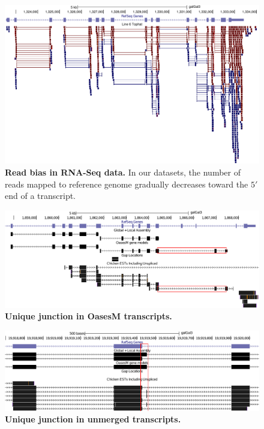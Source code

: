 \documentclass[10pt]{article}
\begin{document}
\begin{figure}[!ht]
\begin{center}
\includegraphics[width=6in]{read_bias.pdf}
\end{center}
\caption{
{\bf Read bias in RNA-Seq data.} In our datasets, the number of reads
mapped to reference genome gradually decreases toward the $5'$ end
of a transcript.
}
\label{Figure_label}
\end{figure}

\begin{figure}[!ht]
\begin{center}
\includegraphics[width=6in]{uniq_junc_oasesM.pdf}
\end{center}
\caption{
{\bf Unique junction in OasesM transcripts.}
}
\label{uniq_junc_oasesM}
\end{figure}

\begin{figure}[!ht]
\begin{center}
\includegraphics[width=6in]{uniq_junc_unmerged.pdf}
\end{center}
\caption{
{\bf Unique junction in unmerged transcripts.}
}
\label{uniq_junc_unmerged}
\end{figure}
\end{document}
